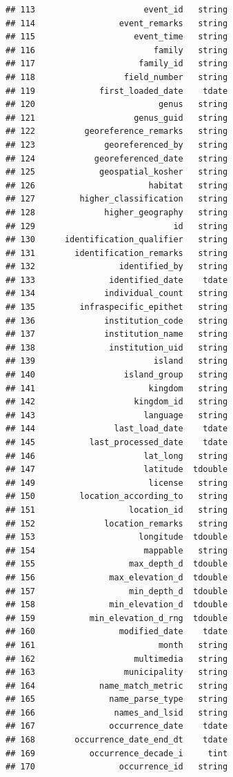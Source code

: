 \documentclass[
  10pt,
]{article}
\begin{document}
\begin{verbatim}
## 113                      event_id   string
## 114                 event_remarks   string
## 115                    event_time   string
## 116                        family   string
## 117                     family_id   string
## 118                  field_number   string
## 119             first_loaded_date    tdate
## 120                         genus   string
## 121                    genus_guid   string
## 122          georeference_remarks   string
## 123              georeferenced_by   string
## 124            georeferenced_date   string
## 125             geospatial_kosher   string
## 126                       habitat   string
## 127         higher_classification   string
## 128              higher_geography   string
## 129                            id   string
## 130      identification_qualifier   string
## 131        identification_remarks   string
## 132                 identified_by   string
## 133               identified_date    tdate
## 134              individual_count   string
## 135         infraspecific_epithet   string
## 136              institution_code   string
## 137              institution_name   string
## 138               institution_uid   string
## 139                        island   string
## 140                  island_group   string
## 141                       kingdom   string
## 142                    kingdom_id   string
## 143                      language   string
## 144                last_load_date    tdate
## 145           last_processed_date    tdate
## 146                      lat_long   string
## 147                      latitude  tdouble
## 149                       license   string
## 150         location_according_to   string
## 151                   location_id   string
## 152              location_remarks   string
## 153                     longitude  tdouble
## 154                      mappable   string
## 155                   max_depth_d  tdouble
## 156               max_elevation_d  tdouble
## 157                   min_depth_d  tdouble
## 158               min_elevation_d  tdouble
## 159           min_elevation_d_rng  tdouble
## 160                 modified_date    tdate
## 161                         month   string
## 162                    multimedia   string
## 163                  municipality   string
## 164             name_match_metric   string
## 165               name_parse_type   string
## 166                names_and_lsid   string
## 167               occurrence_date    tdate
## 168        occurrence_date_end_dt    tdate
## 169           occurrence_decade_i     tint
## 170                 occurrence_id   string

\end{verbatim}
\end{document}
